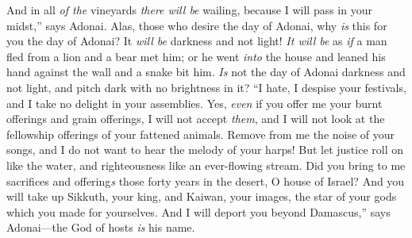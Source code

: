 \begin{biblechapter}
\verse And in all \textit{of the} vineyards \textit{there will be} wailing, because I will pass in your midst,” says Adonai.
 Alas, those who desire the day of Adonai, why \textit{is} this for you the day of Adonai? It \textit{will be} darkness and not light!
\verse \textit{It will be} as \textit{if} a man fled from a lion and a bear met him; or he went \textit{into} the house and leaned his hand against the wall and a snake bit him.
\verse \textit{Is} not the day of Adonai darkness and not light, and pitch dark with no brightness in it?
\verse “I hate, I despise your festivals, and I take no delight in your assemblies.
\verse Yes, \textit{even} if you offer me your burnt offerings and grain offerings, I will not accept \textit{them}, and I will not look at the fellowship offerings of your fattened animals.
\verse Remove from me the noise of your songs, and I do not want to hear the melody of your harps!
\verse But let justice roll on like the water, and righteousness like an ever-flowing stream.
\verse Did you bring to me sacrifices and offering\textit{s} those forty years in the desert, O house of Israel?
\verse And you will take up Sikkuth, your king, and Kaiwan, your images, the star of your gods which you made for yourselves.
\verse And I will deport you beyond Damascus,” says Adonai—the God of hosts \textit{is} his name.
\end{biblechapter}

